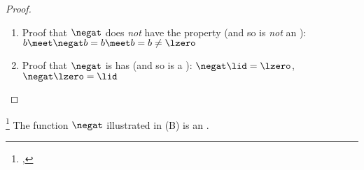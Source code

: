 \begin{proof}
\begin{enumerate}
  \item Proof that $\negat$ does \emph{not} have the  property (and so is \emph{not} an ):
    \\$b\meet \negat b=b\meet b = b \neq \lzero$

  \item Proof that $\negat$ is has  (and so is a ): 
    $\negat\lid=\lzero$,\quad$\negat\lzero=\lid$
\end{enumerate}
\end{proof}


\begin{example}
\footnote{
  ,
  }
\label{ex:negat_m2_ortho}
    The function $\negat$ illustrated in  (B) is an  .
\end{example}
